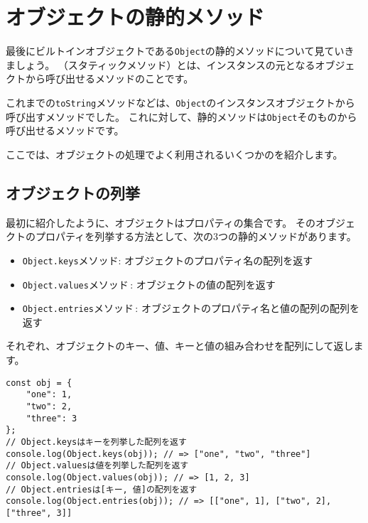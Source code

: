 \hypertarget{static-method}{%
\section{オブジェクトの静的メソッド}\label{static-method}}

最後にビルトインオブジェクトである\texttt{Object}の静的メソッドについて見ていきましょう。
\textbf{}（スタティックメソッド）とは、インスタンスの元となるオブジェクトから呼び出せるメソッドのことです。

これまでの\texttt{toString}メソッドなどは、\texttt{Object}のインスタンスオブジェクトから呼び出すメソッドでした。
これに対して、静的メソッドは\texttt{Object}そのものから呼び出せるメソッドです。

ここでは、オブジェクトの処理でよく利用されるいくつかの\textbf{}を紹介します。

\hypertarget{enumeration}{%
\subsection{オブジェクトの列挙}\label{enumeration}}

最初に紹介したように、オブジェクトはプロパティの集合です。
そのオブジェクトのプロパティを列挙する方法として、次の3つの静的メソッドがあります。

\begin{itemize}
\item
  \texttt{Object.keys}メソッド:
  オブジェクトのプロパティ名の配列を返す
\item
  \texttt{Object.values}メソッド\,\protect{}:
  オブジェクトの値の配列を返す
\item
  \texttt{Object.entries}メソッド\,\protect{}:
  オブジェクトのプロパティ名と値の配列の配列を返す
\end{itemize}

それぞれ、オブジェクトのキー、値、キーと値の組み合わせを配列にして返します。

\begin{lstlisting}
const obj = {
    "one": 1,
    "two": 2,
    "three": 3
};
// Object.keysはキーを列挙した配列を返す
console.log(Object.keys(obj)); // => ["one", "two", "three"]
// Object.valuesは値を列挙した配列を返す
console.log(Object.values(obj)); // => [1, 2, 3]
// Object.entriesは[キー, 値]の配列を返す
console.log(Object.entries(obj)); // => [["one", 1], ["two", 2], ["three", 3]]
\end{lstlisting}

